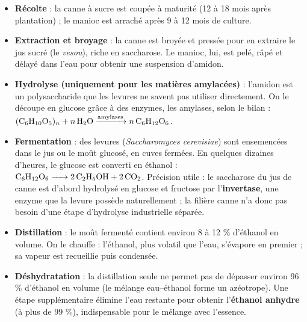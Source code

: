 \documentclass[11pt]{article}
\newcommand{\cle}[1]{{\popxbold\color{popdark}#1}}
\begin{document}
\begin{itemize}
\item \textbf{Récolte} : la canne à sucre est coupée à maturité (12 à 18 mois après plantation) ; le manioc est arraché après 9 à 12 mois de culture.
\item \textbf{Extraction et broyage} : la canne est broyée et pressée pour en extraire le jus sucré (le \emph{vesou}), riche en saccharose. Le manioc, lui, est pelé, râpé et délayé dans l'eau pour obtenir une suspension d'amidon.
\item \textbf{Hydrolyse (uniquement pour les matières amylacées)} : l'amidon est un polysaccharide que les levures ne savent pas utiliser directement. On le découpe en glucose grâce à des enzymes, les \cle{amylases}, selon le bilan : $\ce{(C6H10O5)_{n} + n H2O ->[amylases] n C6H12O6}$.
\item \textbf{Fermentation} : des levures (\emph{Saccharomyces cerevisiae}) sont ensemencées dans le jus ou le moût glucosé, en cuves fermées. En quelques dizaines d'heures, le glucose est converti en éthanol : $\ce{C6H12O6 -> 2 C2H5OH + 2 CO2}$. Précision utile : le saccharose du jus de canne est d'abord hydrolysé en glucose et fructose par l'\textbf{invertase}, une enzyme que la levure possède naturellement ; la filière canne n'a donc pas besoin d'une étape d'hydrolyse industrielle séparée.
\item \textbf{Distillation} : le moût fermenté contient environ 8 à 12 \% d'éthanol en volume. On le chauffe : l'éthanol, plus volatil que l'eau, s'évapore en premier ; sa vapeur est recueillie puis condensée.
\item \textbf{Déshydratation} : la distillation seule ne permet pas de dépasser environ 96 \% d'éthanol en volume (le mélange eau--éthanol forme un azéotrope). Une étape supplémentaire élimine l'eau restante pour obtenir l'\textbf{éthanol anhydre} (à plus de 99 \%), indispensable pour le mélange avec l'essence.
\end{itemize}
\end{document}
